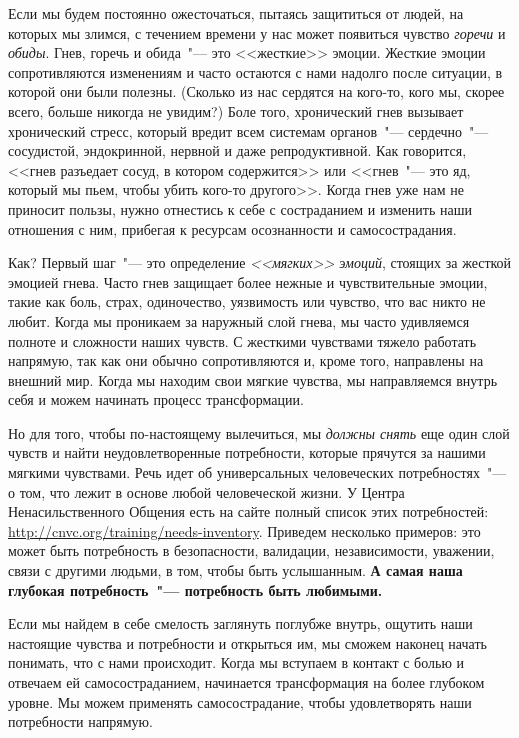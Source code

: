 Если мы будем постоянно ожесточаться, пытаясь защититься от людей, на которых мы злимся, с течением времени у нас может появиться чувство \emph{горечи} и \emph{обиды}. Гнев, горечь и обида~"--- это <<жесткие>> эмоции\cite{109}. Жесткие эмоции сопротивляются изменениям и часто остаются с нами надолго после ситуации, в которой они были полезны. (Сколько из нас сердятся на кого-то, кого мы, скорее всего, больше никогда не увидим?) Боле того, хронический гнев вызывает хронический стресс, который вредит всем системам органов~"--- сердечно~"--- сосудистой, эндокринной, нервной и даже репродуктивной\cite{110}. Как говорится, <<гнев разъедает сосуд, в котором содержится>> или <<гнев~"--- это яд, который мы пьем, чтобы убить кого-то другого>>. Когда гнев уже нам не приносит пользы, нужно отнестись к себе с состраданием и изменить наши отношения с ним, прибегая к ресурсам осознанности и самосострадания.

Как? Первый шаг~"--- это определение \emph{<<мягких>> эмоций}, стоящих за жесткой эмоцией гнева. Часто гнев защищает более нежные и чувствительные эмоции, такие как боль, страх, одиночество, уязвимость или чувство, что вас никто не любит. Когда мы проникаем за наружный слой гнева, мы часто удивляемся полноте и сложности наших чувств. С жесткими чувствами тяжело работать напрямую, так как они обычно сопротивляются и, кроме того, направлены на внешний мир. Когда мы находим свои мягкие чувства, мы направляемся внутрь себя и можем начинать процесс трансформации.

Но для того, чтобы по-настоящему вылечиться, мы \emph{должны снять} еще один слой чувств и найти неудовлетворенные потребности, которые прячутся за нашими мягкими чувствами. Речь идет об универсальных человеческих потребностях~"--- о том, что лежит в основе любой человеческой жизни\cite{111}. У Центра Ненасильственного Общения есть на сайте полный список этих потребностей: \url{http://cnvc.org/training/needs-inventory}. Приведем несколько примеров: это может быть потребность в безопасности, валидации, независимости, уважении, связи с другими людьми, в том, чтобы быть услышанным. \textbf{А самая наша глубокая потребность~"--- потребность быть любимыми.}

Если мы найдем в себе смелость заглянуть поглубже внутрь, ощутить наши настоящие чувства и потребности и открыться им, мы сможем наконец начать понимать, что с нами происходит. Когда мы вступаем в контакт с болью и отвечаем ей самосостраданием, начинается трансформация на более глубоком уровне. Мы можем применять самосострадание, чтобы удовлетворять наши потребности напрямую. 


